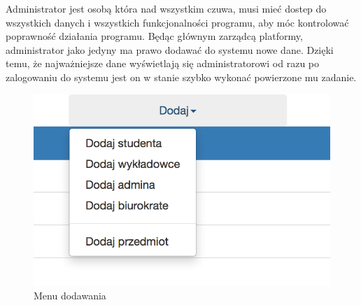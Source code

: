 \documentclass[brudnopis]{xmgr}
\begin{document}
Administrator jest osobą która nad wszystkim czuwa, musi mieć dostep do wszystkich danych i wszystkich funkcjonalności programu, aby móc kontrolować poprawność działania programu. Będąc głównym zarządcą platformy, administrator jako jedyny ma prawo dodawać do systemu nowe dane. Dzięki temu, że najważniejsze dane wyświetlają się administratorowi od razu po zalogowaniu do systemu jest on w stanie szybko wykonać powierzone mu zadanie.

\begin{figure}[th!]
\centering
\includegraphics[scale=0.6]{images/menu.png} 
\caption{Menu dodawania\label{RYS.4}}
\end{figure}
\end{document}
